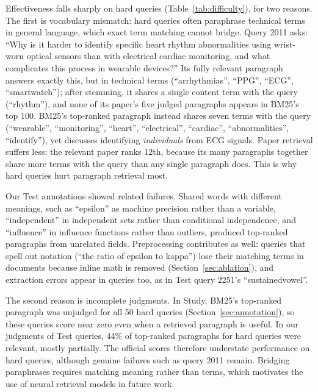 \documentclass[sigconf,nonacm]{acmart}
\begin{document}
Effectiveness falls sharply on hard queries (Table~\ref{tab:difficulty}), for two reasons. 
The first is vocabulary mismatch: hard queries often paraphrase technical terms in general 
language, which exact term matching cannot bridge. Query 2011 asks: ``Why is it harder to 
identify specific heart rhythm abnormalities using wrist-worn optical sensors than with 
electrical cardiac monitoring, and what complicates this process in wearable devices?'' Its
fully relevant paragraph answers exactly this, but in technical terms (``arrhythmias'', 
``PPG'', ``ECG'', ``smartwatch''); after stemming, it shares a single content term with the 
query (``rhythm''), and none of its paper's five judged paragraphs appears in BM25's top 100. 
BM25's top-ranked paragraph instead shares seven terms with the query (``wearable'', ``monitoring'', 
``heart'', ``electrical'', ``cardiac'', ``abnormalities'', ``identify''), yet discusses identifying 
\emph{individuals} from ECG signals. Paper retrieval suffers less: the relevant paper ranks 
12th, because its many paragraphs together share more terms with the query than any single 
paragraph does. This is why hard queries hurt paragraph retrieval most. 

Our Test annotations showed related failures. Shared words with different meanings, such as 
``epsilon'' as machine precision rather than a variable, ``independent'' in independent sets 
rather than conditional independence, and ``influence'' in influence functions rather than outliers, 
produced top-ranked paragraphs from unrelated fields. Preprocessing contributes as well: queries 
that spell out notation (``the ratio of epsilon to kappa'') lose their matching terms in 
documents because inline math is removed (Section~\ref{sec:ablation}), and extraction errors 
appear in queries too, as in Test query 2251's ``sustainedvowel''.

The second reason is incomplete judgments. In Study, BM25's top-ranked paragraph was 
unjudged for all 50 hard queries (Section~\ref{sec:annotation}), so these queries score 
near zero even when a retrieved paragraph is useful. In our judgments of Test queries, 
44\% of top-ranked paragraphs for hard queries were relevant, mostly partially. The 
official scores therefore understate performance on hard queries, although genuine failures 
such as query 2011 remain. Bridging paraphrases requires matching meaning rather than terms, 
which motivates the use of neural retrieval models in future work.
\end{document}
